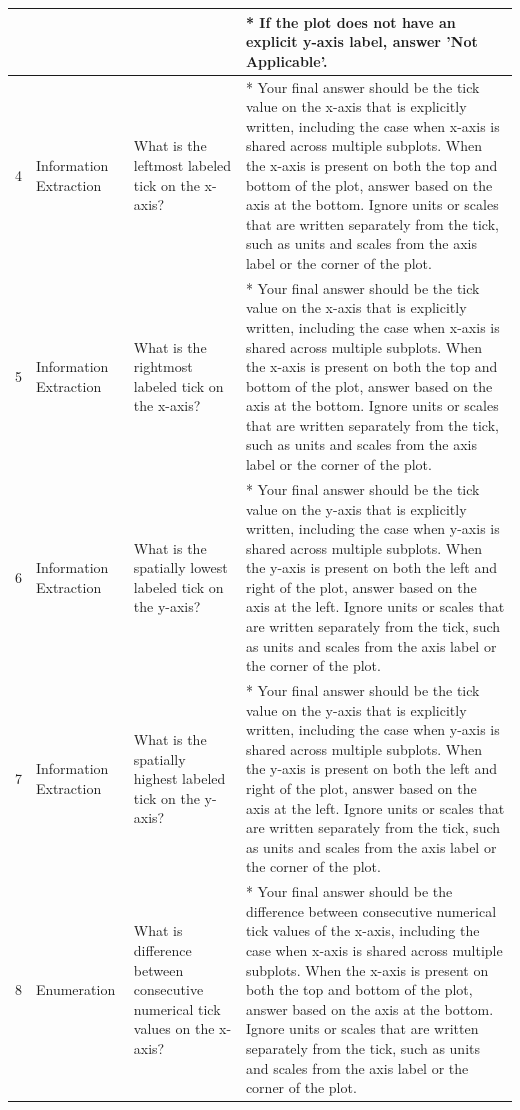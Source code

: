 \begin{longtable}{p{0.7cm}p{1.8cm}p{2cm}p{7.7cm}}
 &  &  & * If the plot does not have an explicit y-axis label, answer 'Not Applicable'. \\
 \midrule
4 & Information Extraction & What is the leftmost labeled tick on the x-axis? & * Your final answer should be the tick value on the x-axis that is explicitly written, including the case when x-axis is shared across multiple subplots. When the x-axis is present on both the top and bottom of the plot, answer based on the axis at the bottom. Ignore units or scales that are written separately from the tick, such as units and scales from the axis label or the corner of the plot. \\
\midrule
5 & Information Extraction & What is the rightmost labeled tick on the x-axis? & * Your final answer should be the tick value on the x-axis that is explicitly written, including the case when x-axis is shared across multiple subplots. When the x-axis is present on both the top and bottom of the plot, answer based on the axis at the bottom. Ignore units or scales that are written separately from the tick, such as units and scales from the axis label or the corner of the plot. \\
\midrule
6 & Information Extraction & What is the spatially lowest labeled tick on the y-axis? & * Your final answer should be the tick value on the y-axis that is explicitly written, including the case when y-axis is shared across multiple subplots. When the y-axis is present on both the left and right of the plot, answer based on the axis at the left. Ignore units or scales that are written separately from the tick, such as units and scales from the axis label or the corner of the plot. \\
\midrule
7 & Information Extraction & What is the spatially highest labeled tick on the y-axis? & * Your final answer should be the tick value on the y-axis that is explicitly written, including the case when y-axis is shared across multiple subplots. When the y-axis is present on both the left and right of the plot, answer based on the axis at the left. Ignore units or scales that are written separately from the tick, such as units and scales from the axis label or the corner of the plot. \\
\midrule
\multirow{2}{0.7cm}{8} & \multirow{2}{1.8cm}{Enumeration} & \multirow{2}{2cm}{What is difference between consecutive numerical tick values on the x-axis?} & * Your final answer should be the difference between consecutive numerical tick values of the x-axis, including the case when x-axis is shared across multiple subplots. When the x-axis is present on both the top and bottom of the plot, answer based on the axis at the bottom. Ignore units or scales that are written separately from the tick, such as units and scales from the axis label or the corner of the plot. \\

\end{longtable}
